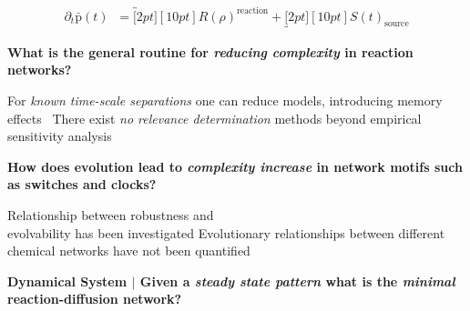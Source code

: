 \documentclass[a0,portrait]{a0poster}
\begin{document}
\begin{align*}
	\partial_t\bar{\mathrm{p}}(t)\;\;=
	\overbracket[2pt][10pt]{R(\rho)}^{\text{reaction}}+
	\underbracket[2pt][10pt]{S(t)}_{\text{source}}
\end{align*}


\begin{multicols}{2}

\begin{tcolorbox}[boxrule=2pt,arc=3.4pt,boxsep=2mm]
	\begin{center}
		\textbf{
		What is the general routine for \textit{reducing complexity} in reaction networks?}
	\end{center}
\end{tcolorbox}

\begin{itemize}[leftmargin=5cm]
	\up For \textit{known time-scale separations} one can reduce models, introducing memory effects~\cite{Phillies2000ProjectionFormalism}
	\down There exist \textit{no relevance determination} methods beyond
	empirical sensitivity analysis~\cite{Cardelli2016NoiseSwitches}
\end{itemize}

\vfill
\columnbreak

\begin{tcolorbox}[boxrule=2pt,arc=3.4pt,boxsep=2mm]
	\begin{center}
		\textbf{
		How does evolution lead to \textit{complexity increase} in network motifs such as switches and clocks?}
	\end{center}
\end{tcolorbox}

\begin{itemize}[leftmargin=5cm]
	\up Relationship between robustness and \\evolvability has been investigated \cite{Daniels2008SloppinessBiology}
	\down Evolutionary relationships between different chemical networks have not been quantified
\end{itemize}

\vfill
\end{multicols}
\vspace{1cm}

\begin{tcolorbox}[boxrule=2pt,arc=3.4pt,boxsep=2mm]
	\begin{center}
		\textbf{\color{Grey}Dynamical System \color{Black}$|$
		Given a \textit{steady state pattern} what is the \textit{minimal} reaction-diffusion network?}
	\end{center}
\end{tcolorbox}
\end{document}
